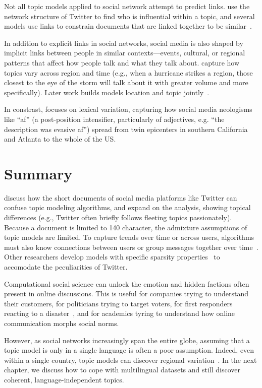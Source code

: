 Not all topic models applied to social network attempt to predict
links.  \citet{weng-10} use the network structure of Twitter to find
who is influential within a topic, and several models use links to
constrain documents that are linked together to be
similar~\citep{mei-08,sun-09,daume-09}.

In addition to explicit links in social networks, social media is also
shaped by implicit links between people in similar contexts---events,
cultural, or regional patterns that affect how people talk and what
they talk about.  \citet{mei-06} capture how topics vary across region
and time (e.g., when a hurricane strikes a region, those closest to
the eye of the storm will talk about it with greater volume and more
specifically).  Later work builds models location and topic
jointly~\citep{yin-11}.

In constrast, \citet{eisenstein-17} focuses on lexical variation,
capturing how social media neologisms like ``af'' (a post-position
intensifier, particularly of adjectives, e.g. ``the description was
evasive af'') spread from twin epicenters in southern California and
Atlanta to the whole of the US.

\section{Summary}

\citet{hong-10} discuss how the short documents of social media
platforms like Twitter can confuse topic modeling algorithms, and
\citet{zhao-11} expand on the analysis, showing topical differences
(e.g., Twitter often briefly follows fleeting topics passionately).
Because a document is limited to 140 character, the admixture
assumptions of topic models are limited.  To capture trends over time
or across users, algorithms must also know connections between users
or group messages together over time~\citep{mehrotra-13}.  Other
researchers develop models with specific sparsity
properties~\citep{lin-14} to accomodate the peculiarities of Twitter.

Computational social science can unlock the emotion and hidden
factions often present in online discussions.  This is useful for
companies trying to understand their customers, for politicians trying
to target voters, for first responders reacting to a
disaster~\citep{kireyev-09}, and for academics tyring to understand
how online communication morphs social norms.

However, as social networks increasingly span the entire globe,
assuming that a topic model is only in a single language is often a
poor assumption.  Indeed, even within a single country, topic models
can discover regional variation~\citep{eisenstein-10}.  In the next
chapter, we discuss how to cope with multilingual datasets and still
discover coherent, language-independent topics.


